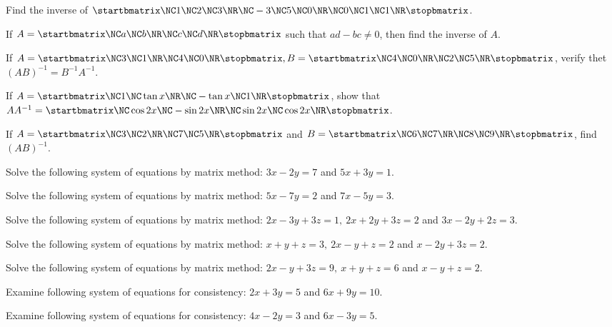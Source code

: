 \item Find the inverse of $\startbmatrix\NC 1 \NC 2 \NC 3 \NR\NC -3 \NC 5 \NC 0 \NR\NC 0 \NC 1 \NC 1\NR\stopbmatrix $.
\item If $A = \startbmatrix\NC a \NC b \NR\NC c \NC d\NR\stopbmatrix $ such that $ad - bc \neq 0$, then find the inverse of $A$.
\item If $A = \startbmatrix\NC 3 \NC 1 \NR\NC 4 \NC 0\NR\stopbmatrix , B = \startbmatrix\NC  4 \NC 0 \NR\NC 2 \NC 5 \NR\stopbmatrix $, verify thet $(AB)^{-1}
  = B^{-1}A^{-1}$.
\item If $A = \startbmatrix\NC 1 \NC \tan x \NR\NC -\tan x \NC 1\NR\stopbmatrix $, show that $AA^{-1} = \startbmatrix\NC \cos 2x \NC -\sin 2x
    \NR\NC \sin 2x \NC \cos 2x\NR\stopbmatrix $.
\item If $A = \startbmatrix\NC  3 \NC 2 \NR\NC 7 \NC 5 \NR\stopbmatrix $ and $B = \startbmatrix\NC  6 \NC 7 \NR\NC 8 \NC 9 \NR\stopbmatrix $, find $(AB)^{-1}$.
\item Solve the following system of equations by matrix method: $3x - 2y = 7$ and $5x + 3y = 1$.
\item Solve the following system of equations by matrix method: $5x - 7y = 2$ and $7x -5y = 3$.
\item Solve the following system of equations by matrix method: $2x - 3y + 3z = 1,\ 2x + 2y + 3z = 2$ and $3x -2y + 2z = 3$.
\item Solve the following system of equations by matrix method: $x + y + z = 3,\ 2x - y + z = 2$ and $x - 2y + 3z = 2$.
\item Solve the following system of equations by matrix method: $2x - y + 3z = 9,\ x + y + z = 6$ and $x - y + z = 2$.
\item Examine following system of equations for consistency: $2x + 3y = 5$ and $6x + 9y = 10$.
\item Examine following system of equations for consistency: $4x - 2y = 3$ and $6x - 3y = 5$.
\stopitemize

